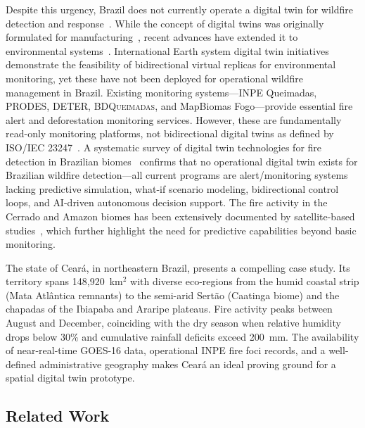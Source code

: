 \documentclass[11pt,twocolumn,a4paper]{article}
\newcommand{\abbrev}[1]{{\small\textsc{#1}}}
\begin{document}
Despite this urgency, Brazil does not currently operate a digital twin for wildfire detection and response~\cite{morsali2026,raha2025}. While the concept of digital twins was originally formulated for manufacturing~\cite{grieves2014,tao2019,barricelli2019}, recent advances have extended it to environmental systems~\cite{rasheed2020,fuller2020,jones2020}. International Earth system digital twin initiatives~\cite{bauer2021_nature,voosen2020,nativi2021,bauer2023_natrev} demonstrate the feasibility of bidirectional virtual replicas for environmental monitoring, yet these have not been deployed for operational wildfire management in Brazil. Existing monitoring systems---\abbrev{INPE} Queimadas, \abbrev{PRODES}, \abbrev{DETER}, \abbrev{BDQueimadas}, and MapBiomas Fogo---provide essential fire alert and deforestation monitoring services. However, these are fundamentally read-only monitoring platforms, not bidirectional digital twins as defined by \abbrev{ISO}/\abbrev{IEC} 23247~\cite{iso2021}. A systematic survey of digital twin technologies for fire detection in Brazilian biomes~\cite{mukkavilli2023,prapas2023} confirms that no operational digital twin exists for Brazilian wildfire detection---all current programs are alert/monitoring systems lacking predictive simulation, what-if scenario modeling, bidirectional control loops, and \abbrev{AI}-driven autonomous decision support. The fire activity in the Cerrado and Amazon biomes has been extensively documented by satellite-based studies~\cite{barbosa2024_amazon,cano2024_latam}, which further highlight the need for predictive capabilities beyond basic monitoring.

The state of Cear\'{a}, in northeastern Brazil, presents a compelling case study. Its territory spans 148,920~km$^2$ with diverse eco-regions from the humid coastal strip (Mata Atl\^{a}ntica remnants) to the semi-arid Sert\~{a}o (Caatinga biome) and the chapadas of the Ibiapaba and Araripe plateaus. Fire activity peaks between August and December, coinciding with the dry season when relative humidity drops below 30\% and cumulative rainfall deficits exceed 200~mm. The availability of near-real-time \abbrev{GOES-16} data, operational \abbrev{INPE} fire foci records, and a well-defined administrative geography makes Cear\'{a} an ideal proving ground for a spatial digital twin prototype.

\subsection{Related Work}
\end{document}
